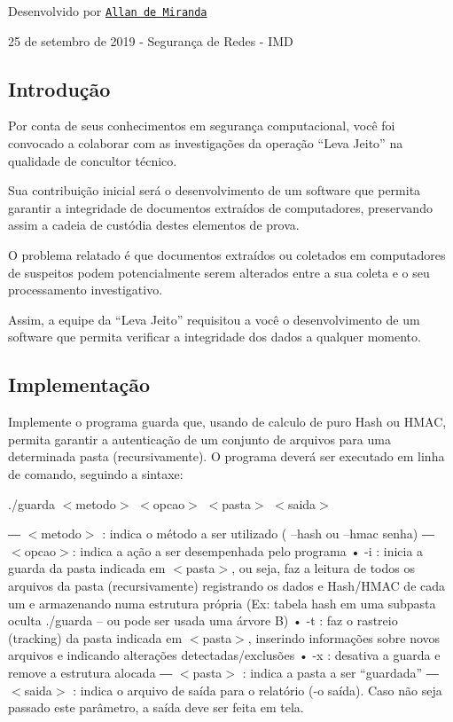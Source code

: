 Desenvolvido por \href{https://github.com/allandemiranda}{\tt Allan de Miranda}

25 de setembro de 2019 -\/ Segurança de Redes -\/ I\+MD

\subsection*{Introdução}

Por conta de seus conhecimentos em segurança computacional, você foi convocado a colaborar com as investigações da operação “\+Leva Jeito” na qualidade de concultor técnico.

Sua contribuição inicial será o desenvolvimento de um software que permita garantir a integridade de documentos extraídos de computadores, preservando assim a cadeia de custódia destes elementos de prova.

O problema relatado é que documentos extraídos ou coletados em computadores de suspeitos podem potencialmente serem alterados entre a sua coleta e o seu processamento investigativo.

Assim, a equipe da “\+Leva Jeito” requisitou a você o desenvolvimento de um software que permita verificar a integridade dos dados a qualquer momento.

\subsection*{Implementação}

Implemente o programa guarda que, usando de calculo de puro Hash ou H\+M\+AC, permita garantir a autenticação de um conjunto de arquivos para uma determinada pasta (recursivamente). O programa deverá ser executado em linha de comando, seguindo a sintaxe\+:

./guarda $<$metodo$>$ $<$opcao$>$ $<$pasta$>$ $<$saida$>$

― $<$metodo$>$ \+: indica o método a ser utilizado ( --hash ou --hmac senha) ― $<$opcao$>$\+: indica a ação a ser desempenhada pelo programa • -\/i \+: inicia a guarda da pasta indicada em $<$pasta$>$, ou seja, faz a leitura de todos os arquivos da pasta (recursivamente) registrando os dados e Hash/\+H\+M\+AC de cada um e armazenando numa estrutura própria (Ex\+: tabela hash em uma subpasta oculta ./guarda – ou pode ser usada uma árvore B) • -\/t \+: faz o rastreio (tracking) da pasta indicada em $<$pasta$>$, inserindo informações sobre novos arquivos e indicando alterações detectadas/exclusões • -\/x \+: desativa a guarda e remove a estrutura alocada ― $<$pasta$>$ \+: indica a pasta a ser “guardada” ― $<$saida$>$ \+: indica o arquivo de saída para o relatório (-\/o saída). Caso não seja passado este parâmetro, a saída deve ser feita em tela.

